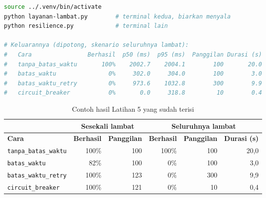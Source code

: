 \begin{lstlisting}[language=bash, caption={Membandingkan empat cara memanggil layanan yang lambat, tersedia di \berkas{sources/chapter04/resilience.py}}, label={lst:c4-lat5-jalan}]
source ../.venv/bin/activate
python layanan-lambat.py        # terminal kedua, biarkan menyala
python resilience.py            # terminal lain

# Keluarannya (dipotong, skenario seluruhnya lambat):
#   Cara                Berhasil  p50 (ms)  p95 (ms)  Panggilan Durasi (s)
#   tanpa_batas_waktu       100%    2002.7    2004.1        100       20.0
#   batas_waktu               0%     302.0     304.0        100        3.0
#   batas_waktu_retry         0%     973.6    1032.8        300        9.9
#   circuit_breaker           0%       0.0     318.8         10        0.4
\end{lstlisting}

\begin{table}[!htb]
  \centering
  \caption{Contoh hasil Latihan 5 yang sudah terisi}
  \label{tab:c4-lat5-contoh}
  \begin{tabularx}{\textwidth}{Xrrrrr}
    \hline
     & \multicolumn{2}{c}{\textbf{Sesekali lambat}} & \multicolumn{3}{c}{\textbf{Seluruhnya lambat}} \\
    \hline
    \textbf{Cara} & \textbf{Berhasil} & \textbf{Panggilan} & \textbf{Berhasil} & \textbf{Panggilan} & \textbf{Durasi (s)} \\
    \hline
    \texttt{tanpa\_batas\_waktu} & 100\% & 100 & 100\% & 100 & 20,0 \\
    \hline
    \texttt{batas\_waktu} & 82\% & 100 & 0\% & 100 & 3,0 \\
    \hline
    \texttt{batas\_waktu\_retry} & 100\% & 123 & 0\% & 300 & 9,9 \\
    \hline
    \texttt{circuit\_breaker} & 100\% & 121 & 0\% & 10 & 0,4 \\
    \hline
  \end{tabularx}
\end{table}

